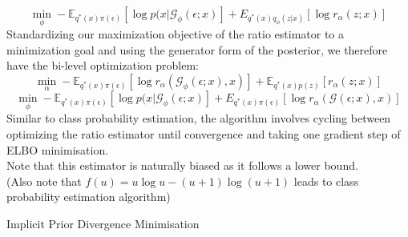 \documentclass[a4paper,12pt]{article}
\numberwithin{equation}{section}
\begin{document}
\[\min_\phi -\mathbb{E}_{q^*(x)\pi(\epsilon)}\left[\log p(x|\mathcal{G}_\phi(\epsilon;x)\right]+E_{q^*(x)q_\phi (z|x)}[\log r_\alpha(z;x)]\]
Standardizing our maximization objective of the ratio estimator to a minimization goal and using the generator form of the posterior, we therefore have the bi-level optimization problem:
\[\min_\alpha -\mathbb{E}_{q^*(x)\pi(\epsilon)}[\log r_\alpha(\mathcal{G}_\phi(\epsilon;x),x)]+\mathbb{E}_{q^*(x)p(z)}[r_\alpha(z;x)]\]
\[\min_\phi -\mathbb{E}_{q^*(x)\pi(\epsilon)}\left[\log p(x|\mathcal{G}_\phi(\epsilon;x)\right]+E_{q^*(x)\pi(\epsilon)}[\log r_\alpha(\mathcal{G}(\epsilon;x),x)]\]
Similar to class probability estimation, the algorithm involves cycling between optimizing the ratio estimator until convergence and taking one gradient step of ELBO minimisation.\\
Note that this estimator is naturally biased as it follows a lower bound.\\
(Also note that $f(u)=u\log u-(u+1)\log(u+1)$ leads to class probability estimation algorithm)
\newpage
\begin{algorithm}
\caption{Implicit Prior Divergence Minimisation}
\BlankLine
{}
\end{algorithm}
\newpage
\end{document}
